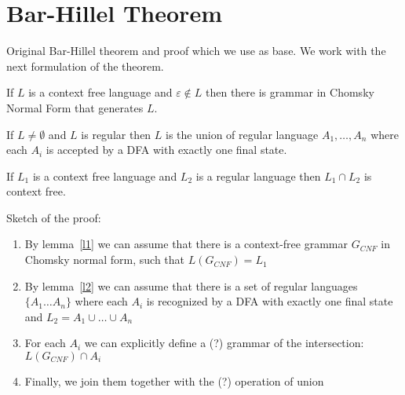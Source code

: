 \section{Bar-Hillel Theorem}

Original Bar-Hillel theorem and proof which we use as base.
We work with the next formulation of the theorem.

\begin{lemma} \label{l1}
	If $L$ is a context free language and $\varepsilon \notin L$ then there is grammar in Chomsky Normal Form that generates $L$.
\end{lemma}

\begin{lemma} \label{l2}
	If $ L \neq \emptyset $ and $L$ is regular then $L$ is the union of regular language $A_1, \ldots , A_n$ where each $A_i$ is accepted by a DFA with exactly one final state.
\end{lemma}

\begin{theorem}
	If $L_1$ is a context free language and $L_2$ is a regular language then $L_1 \cap L_2$ is context free.
\end{theorem}


Sketch of the proof:
\begin{enumerate}
	\item By lemma~\ref{l1} we can assume that there is a context-free grammar $G_{CNF}$ in Chomsky normal form, such that $L(G_{CNF}) = L_1$
	\item By lemma~\ref{l2} we can assume that there is a set of regular languages $\{A_{1} \ldots A_n \}$ where each $A_i$ is recognized by a DFA with exactly one final state and $L_2 = A_1 \cup \ldots \cup A_n$ 
	\item For each $A_i$ we can explicitly define a (?) grammar of the intersection: $L( G_{CNF} ) \cap A_i$
	\item Finally, we join them together with the (?) operation of union
\end{enumerate}
